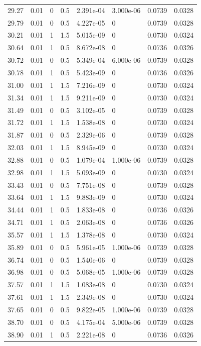 \documentclass[preview]{standalone}
\begin{document}
{{{\begin{tabular}{L{1.2cm}C{1.2cm} C{0.3cm}C{0.5cm} C{1.4cm}C{1.4cm} C{1.4cm}C{1.4cm}}
  29.27  &  0.01  & 0     & 0.5 &  2.391e-04  & 3.000e-06  & 0.0739 &  0.0328   \\ 
  29.79  &  0.01  & 0     & 0.5 &  4.227e-05  & 0  & 0.0739 &  0.0328   \\ 
  30.21  &  0.01  & 1     & 1.5 &  5.015e-09  & 0  & 0.0730 &  0.0324   \\ 
  30.64  &  0.01  & 1     & 0.5 &  8.672e-08  & 0  & 0.0736 &  0.0326   \\ 
  30.72  &  0.01  & 0     & 0.5 &  5.349e-04  & 6.000e-06  & 0.0739 &  0.0328   \\ 
  30.78  &  0.01  & 1     & 0.5 &  5.423e-09  & 0  & 0.0736 &  0.0326   \\ 
  31.00  &  0.01  & 1     & 1.5 &  7.216e-09  & 0  & 0.0730 &  0.0324   \\ 
  31.34  &  0.01  & 1     & 1.5 &  9.211e-09  & 0  & 0.0730 &  0.0324   \\ 
  31.49  &  0.01  & 0     & 0.5 &  3.102e-05  & 0  & 0.0739 &  0.0328   \\ 
  31.72  &  0.01  & 1     & 1.5 &  1.538e-08  & 0  & 0.0730 &  0.0324   \\ 
  31.87  &  0.01  & 0     & 0.5 &  2.329e-06  & 0  & 0.0739 &  0.0328   \\ 
  32.03  &  0.01  & 1     & 1.5 &  8.945e-09  & 0  & 0.0730 &  0.0324   \\ 
  32.88  &  0.01  & 0     & 0.5 &  1.079e-04  & 1.000e-06  & 0.0739 &  0.0328   \\ 
  32.98  &  0.01  & 1     & 1.5 &  5.093e-09  & 0  & 0.0730 &  0.0324   \\ 
  33.43  &  0.01  & 0     & 0.5 &  7.751e-08  & 0  & 0.0739 &  0.0328   \\ 
  33.64  &  0.01  & 1     & 1.5 &  9.883e-09  & 0  & 0.0730 &  0.0324   \\ 
  34.44  &  0.01  & 1     & 0.5 &  1.833e-08  & 0  & 0.0736 &  0.0326   \\ 
  34.71  &  0.01  & 1     & 0.5 &  2.063e-08  & 0  & 0.0736 &  0.0326   \\ 
  35.57  &  0.01  & 1     & 1.5 &  1.378e-08  & 0  & 0.0730 &  0.0324   \\ 
  35.89  &  0.01  & 0     & 0.5 &  5.961e-05  & 1.000e-06  & 0.0739 &  0.0328   \\ 
  36.74  &  0.01  & 0     & 0.5 &  1.540e-06  & 0  & 0.0739 &  0.0328   \\ 
  36.98  &  0.01  & 0     & 0.5 &  5.068e-05  & 1.000e-06  & 0.0739 &  0.0328   \\ 
  37.57  &  0.01  & 1     & 1.5 &  1.083e-08  & 0  & 0.0730 &  0.0324   \\ 
  37.61  &  0.01  & 1     & 1.5 &  2.349e-08  & 0  & 0.0730 &  0.0324   \\ 
  37.65  &  0.01  & 0     & 0.5 &  9.822e-05  & 1.000e-06  & 0.0739 &  0.0328   \\ 
  38.70  &  0.01  & 0     & 0.5 &  4.175e-04  & 5.000e-06  & 0.0739 &  0.0328   \\ 
  38.90  &  0.01  & 1     & 0.5 &  2.221e-08  & 0  & 0.0736 &  0.0326   \\ 
\hline 
\end{tabular} 

}}}
\end{document}
